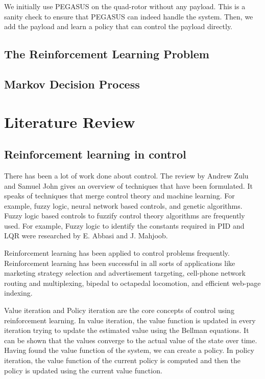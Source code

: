 \documentclass[BTech]{iitmdiss}
\begin{document}
We initially use PEGASUS on the quad-rotor without any payload. This is a sanity check to ensure that PEGASUS can indeed handle the system. Then, we add the payload and learn a policy that can control the payload directly.

\section{The Reinforcement Learning Problem}

\section{Markov Decision Process}


\chapter{Literature Review}

\section{Reinforcement learning in control}

There has been a lot of work done about control. The review \cite{ControlForQuads} by Andrew Zulu and Samuel John gives an overview of techniques that have been formulated. It speaks of techniques that merge control theory and machine learning. For example, fuzzy logic, neural network based controls, and genetic algorithms. Fuzzy logic based controls to fuzzify control theory algorithms are frequently used. For example, Fuzzy logic to identify the constants required in PID and LQR were researched by E. Abbasi and J. Mahjoob.

Reinforcement learning has been applied to control problems frequently. Reinforcement learning has been successful in all sorts of applications like marketing strategy selection and advertisement targeting, cell-phone network routing and multiplexing, bipedal to octapedal locomotion, and efficient web-page indexing.

Value iteration and Policy iteration are the core concepts of control using reinforcement learning. In value iteration, the value function is updated in every iteration trying to update the estimated value using the Bellman equations. It can be shown that the values converge to the actual value of the state over time. Having found the value function of the system, we can create a policy. In policy iteration, the value function of the current policy is computed and then the policy is updated using the current value function.
\end{document}
